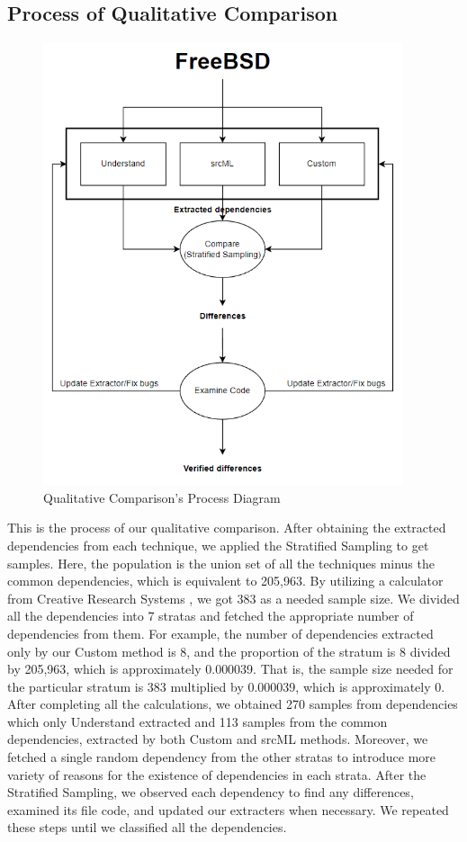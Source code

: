 \documentclass[12pt, dvipsnames, a4paper]{article}
\begin{document}
\subsection{Process of Qualitative Comparison}
\begin{figure}[h]
    \center
    \includegraphics[width=300pt]{assets/qualitative_process_diagram.PNG}
    \caption{Qualitative Comparison's Process Diagram}
\end{figure}
This is the process of our qualitative comparison. After obtaining the extracted dependencies from each technique, we applied the Stratified Sampling to get samples. Here, the population is the union set of all the techniques minus the common dependencies, which is equivalent to 205,963.
By utilizing a calculator from Creative Research Systems \cite{calculator}, we got 383 as a needed sample size. We divided all the dependencies into 7 stratas and fetched the appropriate number of dependencies from them.
For example, the number of dependencies extracted only by our Custom method is 8, and the proportion of the stratum is 8 divided by 205,963, which is approximately 0.000039.
That is, the sample size needed for the particular stratum is 383 multiplied by 0.000039, which is approximately 0.
After completing all the calculations, we obtained 270 samples from dependencies which only Understand extracted and 113 samples from the common dependencies, extracted by both Custom and srcML methods.
Moreover, we fetched a single random dependency from the other stratas to introduce more variety of reasons for the existence of dependencies in each strata.
After the Stratified Sampling, we observed each dependency to find any differences, examined its file code, and updated our extracters when necessary. We repeated these steps until we classified all the dependencies.
\end{document}
